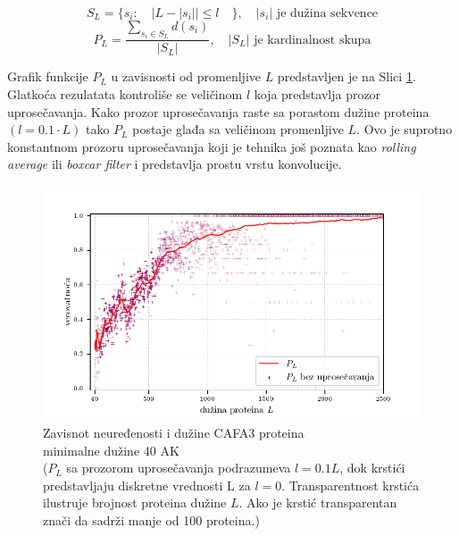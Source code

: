 $$ S_L = \{s_i : \quad | L -  | s_i | | \le l \quad \}, \quad   |s_i| \text{ je dužina sekvence}  $$
$$ P_L = \dfrac{ \sum_{s_i \in S_L} d(s_i)} {| S_L |}, \quad   |S_L| \text{ je kardinalnost skupa}$$

Grafik funkcije $P_L$ u zavisnosti od promenljive $L$ predstavljen je na Slici
\ref{fig:PL1}.  Glatkoća rezulatata kontroliše se veličinom $l$ koja
predstavlja prozor uprosečavanja. Kako prozor uprosečavanja raste sa porastom
dužine proteina $(l = 0.1 \cdot L)$ tako $P_L$ postaje glađa sa veličinom
promenljive $L$. Ovo je suprotno konstantnom prozoru uprosečavanja  koji je
tehnika još poznata kao \textit{rolling average} ili \textit{boxcar filter} i
predstavlja prostu vrstu konvolucije. 


\begin{figure}[th]
\centering
\includegraphics[]{plots/PL_F}
\caption {
  Zavisnot neuređenosti i dužine CAFA3 proteina \\ minimalne dužine 40 AK
  \\ \footnotesize
  ($P_L$ sa prozorom uprosečavanja podrazumeva $l = 0.1L$, dok
  krstići predstavljaju diskretne vrednosti L za $l = 0$. Transparentnost krstića
  ilustruje brojnost proteina dužine $L$. Ako je krstić transparentan
  znači da sadrži manje od 100 proteina.)
}
\label{fig:PL1}
\end{figure}


